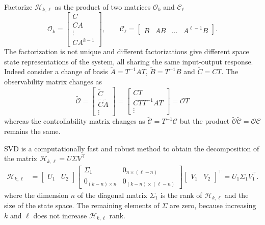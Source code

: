 Factorize $\mathcal{H}_{k,\ell}$ as the product of two matrices $\mathcal{O}_k$ and $\mathcal{C}_\ell$
\begin{equation}
  \label{eq:extended-observability-controllability-matrices}
  \mathcal{O}_k =
  \begin{bmatrix}
    C \\ CA \\ \vdots \\ CA^{k-1}
  \end{bmatrix},\qquad \mathcal{C}_\ell =
  \begin{bmatrix}
    B & AB & \ldots & A^{\ell-1}B
  \end{bmatrix}.
\end{equation}
The factorization is not unique and different factorizations give different space state representations of the system, all sharing the same input-output response. Indeed consider a change of basis $\tilde{A} = T^{-1}AT$, $\tilde{B} = T^{-1}B$ and $\tilde{C} = CT$. The observability matrix changes as
\begin{equation*}
  \tilde{\mathcal{O}} =
  \begin{bmatrix}
    \tilde{C} \\ \tilde{C}\tilde{A} \\ \vdots
  \end{bmatrix} =
  \begin{bmatrix}
    CT \\ CTT^{-1}AT \\ \vdots
  \end{bmatrix} = \mathcal{O}T
\end{equation*}
whereas the controllability matrix changes as $\tilde{\mathcal{C}} = T^{-1}\mathcal{C}$ but the product $\tilde{\mathcal{O}}\tilde{\mathcal{C}} = \mathcal{O}\mathcal{C}$ remains the same.

SVD is a computationally fast and robust method to obtain the decomposition of the matrix $\mathcal{H}_{k,\ell} = U \Sigma V^\top$
\begin{align*}
  \mathcal{H}_{k,\ell} &=
                \begin{bmatrix}
                  U_1 & U_2
                \end{bmatrix}
                \begin{bmatrix}
                  \Sigma_1 & 0_{n \times (\ell-n)} \\
                  0_{(k-n)\times n} & 0_{(k-n)\times (\ell-n)}
                \end{bmatrix}
                \begin{bmatrix}
                  V_1 & V_2
                \end{bmatrix}^\top = U_1 \Sigma_1 V_1^\top.
\end{align*}
where the dimension $n$ of the diagonal matrix $\Sigma_1$ is the rank of $\mathcal{H}_{k,\ell}$ and the size of the state space. The remaining elements of $\Sigma$ are zero, because increasing $k$ and $\ell$ does not increase $\mathcal{H}_{k,\ell}$ rank.

